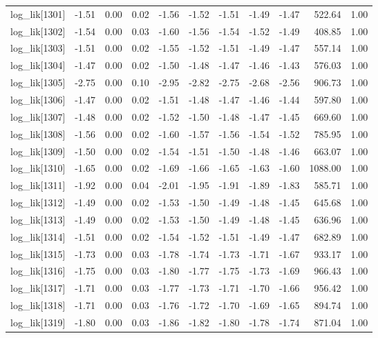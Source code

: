 \begin{table}[ht]
\begin{tabular}{rrrrrrrrrrr}
  log\_lik[1301] & -1.51 & 0.00 & 0.02 & -1.56 & -1.52 & -1.51 & -1.49 & -1.47 & 522.64 & 1.00 \\ 
  log\_lik[1302] & -1.54 & 0.00 & 0.03 & -1.60 & -1.56 & -1.54 & -1.52 & -1.49 & 408.85 & 1.00 \\ 
  log\_lik[1303] & -1.51 & 0.00 & 0.02 & -1.55 & -1.52 & -1.51 & -1.49 & -1.47 & 557.14 & 1.00 \\ 
  log\_lik[1304] & -1.47 & 0.00 & 0.02 & -1.50 & -1.48 & -1.47 & -1.46 & -1.43 & 576.03 & 1.00 \\ 
  log\_lik[1305] & -2.75 & 0.00 & 0.10 & -2.95 & -2.82 & -2.75 & -2.68 & -2.56 & 906.73 & 1.00 \\ 
  log\_lik[1306] & -1.47 & 0.00 & 0.02 & -1.51 & -1.48 & -1.47 & -1.46 & -1.44 & 597.80 & 1.00 \\ 
  log\_lik[1307] & -1.48 & 0.00 & 0.02 & -1.52 & -1.50 & -1.48 & -1.47 & -1.45 & 669.60 & 1.00 \\ 
  log\_lik[1308] & -1.56 & 0.00 & 0.02 & -1.60 & -1.57 & -1.56 & -1.54 & -1.52 & 785.95 & 1.00 \\ 
  log\_lik[1309] & -1.50 & 0.00 & 0.02 & -1.54 & -1.51 & -1.50 & -1.48 & -1.46 & 663.07 & 1.00 \\ 
  log\_lik[1310] & -1.65 & 0.00 & 0.02 & -1.69 & -1.66 & -1.65 & -1.63 & -1.60 & 1088.00 & 1.00 \\ 
  log\_lik[1311] & -1.92 & 0.00 & 0.04 & -2.01 & -1.95 & -1.91 & -1.89 & -1.83 & 585.71 & 1.00 \\ 
  log\_lik[1312] & -1.49 & 0.00 & 0.02 & -1.53 & -1.50 & -1.49 & -1.48 & -1.45 & 645.68 & 1.00 \\ 
  log\_lik[1313] & -1.49 & 0.00 & 0.02 & -1.53 & -1.50 & -1.49 & -1.48 & -1.45 & 636.96 & 1.00 \\ 
  log\_lik[1314] & -1.51 & 0.00 & 0.02 & -1.54 & -1.52 & -1.51 & -1.49 & -1.47 & 682.89 & 1.00 \\ 
  log\_lik[1315] & -1.73 & 0.00 & 0.03 & -1.78 & -1.74 & -1.73 & -1.71 & -1.67 & 933.17 & 1.00 \\ 
  log\_lik[1316] & -1.75 & 0.00 & 0.03 & -1.80 & -1.77 & -1.75 & -1.73 & -1.69 & 966.43 & 1.00 \\ 
  log\_lik[1317] & -1.71 & 0.00 & 0.03 & -1.77 & -1.73 & -1.71 & -1.70 & -1.66 & 956.42 & 1.00 \\ 
  log\_lik[1318] & -1.71 & 0.00 & 0.03 & -1.76 & -1.72 & -1.70 & -1.69 & -1.65 & 894.74 & 1.00 \\ 
  log\_lik[1319] & -1.80 & 0.00 & 0.03 & -1.86 & -1.82 & -1.80 & -1.78 & -1.74 & 871.04 & 1.00 \\ 

\end{tabular}
\end{table}
